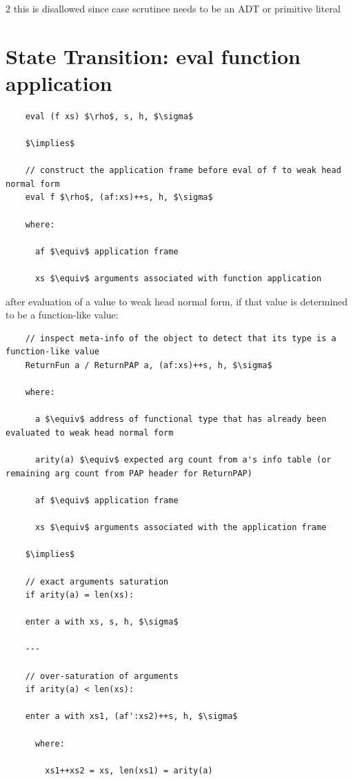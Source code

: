 \documentclass[8pt]{extarticle}
\begin{document}
\begin{multicols*}{2}
  this is disallowed since case scrutinee needs to be an ADT or primitive literal

  \vfill\null
  \columnbreak

  \section{State Transition: eval function application}

  \begin{lstlisting}
    eval (f xs) $\rho$, s, h, $\sigma$
    
    $\implies$

    // construct the application frame before eval of f to weak head normal form
    eval f $\rho$, (af:xs)++s, h, $\sigma$

    where:

      af $\equiv$ application frame

      xs $\equiv$ arguments associated with function application
  \end{lstlisting}

  after evaluation of a value to weak head normal form, if that value is determined to be a function-like value:
      
  \begin{lstlisting}
    // inspect meta-info of the object to detect that its type is a function-like value
    ReturnFun a / ReturnPAP a, (af:xs)++s, h, $\sigma$

    where:

      a $\equiv$ address of functional type that has already been evaluated to weak head normal form

      arity(a) $\equiv$ expected arg count from a's info table (or remaining arg count from PAP header for ReturnPAP)

      af $\equiv$ application frame

      xs $\equiv$ arguments associated with the application frame
    
    $\implies$

    // exact arguments saturation
    if arity(a) = len(xs):
    
    enter a with xs, s, h, $\sigma$  

    ---

    // over-saturation of arguments
    if arity(a) < len(xs):

    enter a with xs1, (af':xs2)++s, h, $\sigma$

      where:

        xs1++xs2 = xs, len(xs1) = arity(a)


\end{lstlisting}
\end{multicols*}
\end{document}
